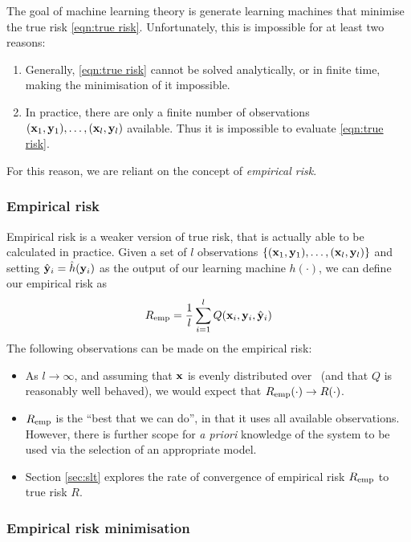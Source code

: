 The goal of machine learning theory is generate learning
machines that minimise the true risk \ref{eqn:true risk}.
Unfortunately, this is impossible for at least two reasons:
%
\begin{enumerate}
\item	Generally, \ref{eqn:true risk} cannot be solved analytically,
	or in finite time, making the minimisation of it impossible.
%
\item	In practice, there are only a finite number of observations
	$(\mathbf{x}_1, \mathbf{y}_1), \ldots, (\mathbf{x}_l, \mathbf{y}_l)$ available.  Thus
	it is impossible to evaluate \ref{eqn:true risk}.
\end{enumerate}
%
For this reason, we are reliant on the concept of \emph{empirical
risk}.

\subsubsection{Empirical risk}
Empirical risk is a weaker version of true risk, that is actually able
to be calculated in practice.  Given a set of $l$ observations
$\{(\mathbf{x}_1, \mathbf{y}_1), \ldots, (\mathbf{x}_l, \mathbf{y}_l)\}$ and setting $\hat{\mathbf{y}}_i
= \hat{h}(\mathbf{y}_i)$ as the output of our learning machine $h(\cdot)$,
we can define our empirical risk as 
%
\begin{equation}
R_{\mathrm{emp}} = \frac{1}{l} \sum_{i=1}^{l} Q(\mathbf{x}_i, \mathbf{y}_i, \hat{\mathbf{y}}_i)
\end{equation}
%
The following observations can be made on the empirical risk:
%
\begin{itemize}
\item 	As $l \rightarrow \infty$, and assuming that $\mathbf{x}$ is evenly
	distributed over \calI\, (and that $Q$ is reasonably well
	behaved), we would expect that $R_{\mathrm{emp}}(\cdot) \rightarrow
	R(\cdot)$.

\item	$R_{\mathrm{emp}}$ is the ``best that we can do'', in that it uses all
	available observations.  However, there is further scope for
	\emph{a priori} knowledge of the system to be used via the
	selection of an appropriate model.

\item	Section \ref{sec:slt} explores the rate of convergence of
	empirical risk $R_{\mathrm{emp}}$ to true risk $R$.
\end{itemize}

\subsubsection{Empirical risk minimisation}

